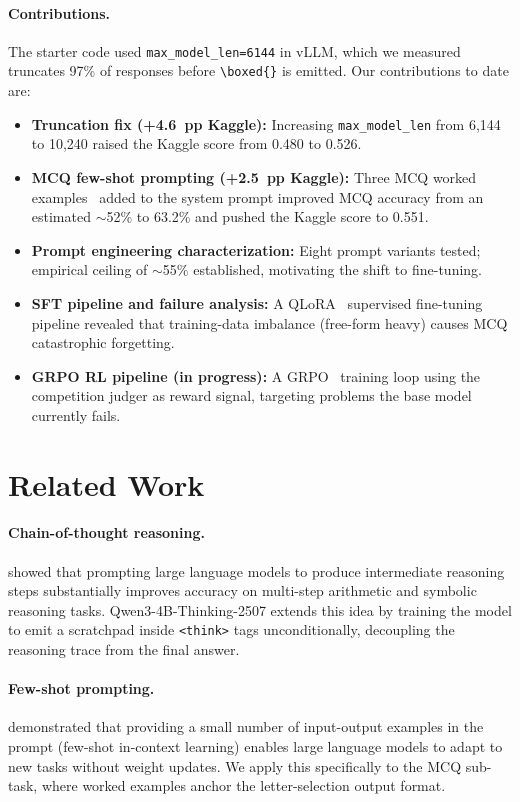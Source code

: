 \documentclass{article}
\begin{document}
\paragraph{Contributions.}
The starter code used \texttt{max\_model\_len=6144} in vLLM, which we measured truncates 97\% of responses before \verb|\boxed{}| is emitted. Our contributions to date are:
\begin{itemize}
  \item \textbf{Truncation fix (+4.6~pp Kaggle):} Increasing \texttt{max\_model\_len} from 6,144 to 10,240 raised the Kaggle score from 0.480 to 0.526.
  \item \textbf{MCQ few-shot prompting (+2.5~pp Kaggle):} Three MCQ worked examples~\cite{brown2020language} added to the system prompt improved MCQ accuracy from an estimated ${\sim}$52\% to 63.2\% and pushed the Kaggle score to 0.551.
  \item \textbf{Prompt engineering characterization:} Eight prompt variants tested; empirical ceiling of ${\sim}$55\% established, motivating the shift to fine-tuning.
  \item \textbf{SFT pipeline and failure analysis:} A QLoRA~\cite{dettmers2024qlora} supervised fine-tuning pipeline revealed that training-data imbalance (free-form heavy) causes MCQ catastrophic forgetting.
  \item \textbf{GRPO RL pipeline (in progress):} A GRPO~\cite{shao2024deepseekmath} training loop using the competition judger as reward signal, targeting problems the base model currently fails.
\end{itemize}


\section{Related Work}
\label{sec:relatedwork}

\paragraph{Chain-of-thought reasoning.}
\citet{wei2022chain} showed that prompting large language models to produce intermediate reasoning steps substantially improves accuracy on multi-step arithmetic and symbolic reasoning tasks. Qwen3-4B-Thinking-2507 extends this idea by training the model to emit a scratchpad inside \verb|<think>| tags unconditionally, decoupling the reasoning trace from the final answer.

\paragraph{Few-shot prompting.}
\citet{brown2020language} demonstrated that providing a small number of input-output examples in the prompt (few-shot in-context learning) enables large language models to adapt to new tasks without weight updates. We apply this specifically to the MCQ sub-task, where worked examples anchor the letter-selection output format.
\end{document}
